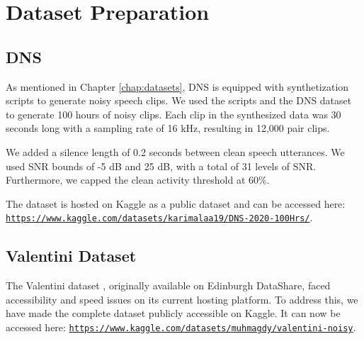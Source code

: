 \section{Dataset Preparation}

\subsection{DNS}
As mentioned in Chapter \ref{chap:datasets}, DNS \cite{reddy2020} is equipped with synthetization scripts to generate noisy speech clips. We used the scripts and the DNS dataset to generate 100 hours of noisy clips. Each clip in the synthesized data was 30 seconds long with a sampling rate of 16 kHz, resulting in 12,000 pair clips.

We added a silence length of 0.2 seconds between clean speech utterances. We used SNR bounds of -5 dB and 25 dB, with a total of 31 levels of SNR. Furthermore, we capped the clean activity threshold at 60\%.

The dataset is hosted on Kaggle as a public dataset and can be accessed here: \texttt{\url{https://www.kaggle.com/datasets/karimalaa19/DNS-2020-100Hrs/}}.


\subsection{Valentini Dataset}
The Valentini dataset \cite{valentini2016}, originally available on Edinburgh DataShare, faced accessibility and speed issues on its current hosting platform. To address this, we have made the complete dataset publicly accessible on Kaggle. It can now be accessed here: \texttt{\url{https://www.kaggle.com/datasets/muhmagdy/valentini-noisy}}.